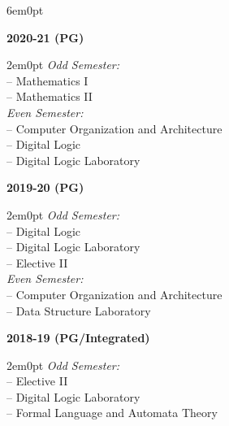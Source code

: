\documentclass[11pt,a4paper]{moderncv}
\begin{document}
\begin{adjustwidth}{6em}{0pt}
	
	\textbf{2020-21 (PG)}
	
	\begin{adjustwidth}{2em}{0pt}
		\textit{Odd Semester:} \\
		\hspace*{1.5em}-- Mathematics I \\
		\hspace*{1.5em}-- Mathematics II \\
		
		\textit{Even Semester:} \\
		\hspace*{1.5em}-- Computer Organization and Architecture \\
		\hspace*{1.5em}-- Digital Logic \\
		\hspace*{1.5em}-- Digital Logic Laboratory \\
	\end{adjustwidth}
	
	
	\textbf{2019-20 (PG)}
	
	\begin{adjustwidth}{2em}{0pt}
		\textit{Odd Semester:} \\
		\hspace*{1.5em}-- Digital Logic \\
		\hspace*{1.5em}-- Digital Logic Laboratory \\
		\hspace*{1.5em}-- Elective II \\
		
		\textit{Even Semester:} \\
		\hspace*{1.5em}-- Computer Organization and Architecture \\
		\hspace*{1.5em}-- Data Structure Laboratory \\
	\end{adjustwidth}
	
	
	\textbf{2018-19 (PG/Integrated)}
	
	\begin{adjustwidth}{2em}{0pt}
		\textit{Odd Semester:} \\
		\hspace*{1.5em}-- Elective II \\
		\hspace*{1.5em}-- Digital Logic Laboratory \\
		\hspace*{1.5em}-- Formal Language and Automata Theory \\
		

\end{adjustwidth}
\end{adjustwidth}
\end{document}
